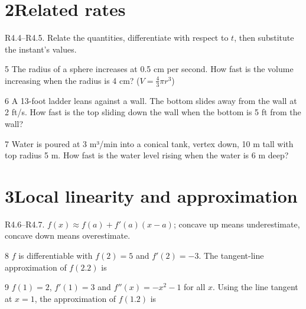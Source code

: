 \documentclass{apcalc}
\begin{document}
\section*{2\quad Related rates}
\begin{setrule}R4.4–R4.5. Relate the quantities, differentiate with respect to $t$, then substitute the instant's values.\end{setrule}
\begin{q}{5}
The radius of a sphere increases at 0.5 cm per second. How fast is the volume increasing when the radius is 4 cm? ($V=\frac43\pi r^3$)
\end{q}
\begin{q}{6}
A 13-foot ladder leans against a wall. The bottom slides away from the wall at 2 ft/s. How fast is the top sliding down the wall when the bottom is 5 ft from the wall?
\end{q}
\begin{q}{7}
Water is poured at 3 m³/min into a conical tank, vertex down, 10 m tall with top radius 5 m. How fast is the water level rising when the water is 6 m deep?
\end{q}
\section*{3\quad Local linearity and approximation}
\begin{setrule}R4.6–R4.7. $f(x)\approx f(a)+f'(a)(x-a)$; concave up means underestimate, concave down means overestimate.\end{setrule}
\begin{q}{8}
$f$ is differentiable with $f(2)=5$ and $f'(2)=-3$. The tangent-line approximation of $f(2.2)$ is
\end{q}
\begin{q}{9}
$f(1)=2$, $f'(1)=3$ and $f''(x)=-x^2-1$ for all $x$. Using the line tangent at $x=1$, the approximation of $f(1.2)$ is
\end{q}
\end{document}
